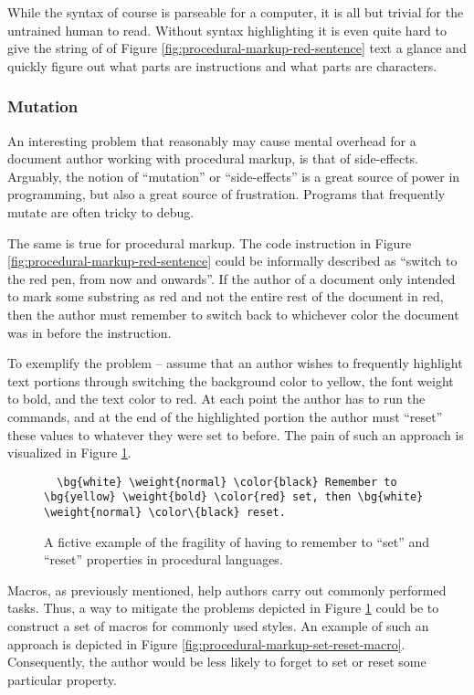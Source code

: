 \documentclass{scrreprt}
\begin{document}
While the syntax of course is parseable for a computer, it is all but trivial for the untrained human to read. Without syntax highlighting it is even quite hard to give the string of of Figure \ref{fig:procedural-markup-red-sentence} text a glance and quickly figure out what parts are instructions and what parts are characters.

\subsubsection{Mutation}
An interesting problem that reasonably may cause mental overhead for a document author working with procedural markup, is that of side-effects. Arguably, the notion of ``mutation'' or ``side-effects'' is a great source of power in programming, but also a great source of frustration. Programs that frequently mutate are often tricky to debug.

The same is true for procedural markup. The code instruction in Figure \ref{fig:procedural-markup-red-sentence} could be informally described as ``switch to the red pen, from now and onwards''. If the author of a document only intended to mark some substring as red and not the entire rest of the document in red, then the author must remember to switch back to whichever color the document was in before the instruction.

To exemplify the problem -- assume that an author wishes to frequently highlight text portions through switching the background color to yellow, the font weight to bold, and the text color to red. At each point the author has to run the commands, and at the end of the highlighted portion the author must ``reset'' these values to whatever they were set to before. The pain of such an approach is visualized in Figure \ref{fig:procedural-markup-set-reset}.


\begin{figure}[h]
\begin{lstlisting}
  \bg{white} \weight{normal} \color{black} Remember to \bg{yellow} \weight{bold} \color{red} set, then \bg{white} \weight{normal} \color\{black} reset.
\end{lstlisting}
\caption{A fictive example of the fragility of having to remember to ``set'' and ``reset'' properties in procedural languages.}
\label{fig:procedural-markup-set-reset}
\end{figure}


Macros, as previously mentioned, help authors carry out commonly performed tasks. Thus, a way to mitigate the problems depicted in Figure \ref{fig:procedural-markup-set-reset} could be to construct a set of macros for commonly used styles. An example of such an approach is depicted in Figure \ref{fig:procedural-markup-set-reset-macro}. Consequently, the author would be less likely to forget to set or reset some particular property.
\end{document}
